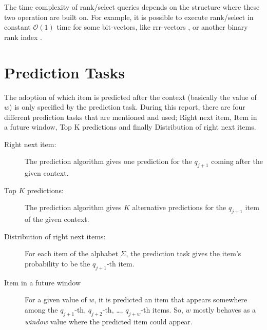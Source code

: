 The time complexity of rank/select queries depends on the structure where these two operation are built on. For example, it is possible to execute rank/select in constant \(\mathcal{O}(1)\) time for some bit-vectors, like rrr-vectors \cite{Raman}, or another binary rank index \cite{dillabaugh_2007}.

\section{Prediction Tasks} \label{App:predtask}
The adoption of which item is predicted after the context (basically the value of \(w\)) is only specified by the prediction task. During this report, there are four different prediction tasks that are mentioned and used; Right next item, Item in a future window, Top K predictions and finally Distribution of right next items. 

\begin{description}
  \item[Right next item:] The prediction algorithm gives one prediction for the \(q_{j+1}\) coming after the given context.
  \item[Top $K$ predictions:]  The prediction algorithm gives $K$ alternative predictions for the \(q_{j+1}\) item of the given context.
  \item[Distribution of right next items:]  For each item of the alphabet \(\Sigma\), the prediction task gives the item's probability to be the \(q_{j+1}\)-th item.
  \item[Item in a future window]  For a given value of \(w\), it is predicted an item that appears somewhere among the \(q_{j+1}\)-th, \(q_{j+2}\)-th, \ldots, \(q_{j+w}\)-th items. So, \(w\) mostly behaves as a \emph{window} value where the predicted item could appear. 
\end{description}